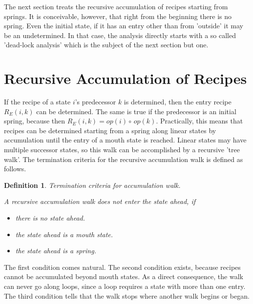 \documentclass[12pt,a4paper]{scrartcl}
\newtheorem{definition}{Definition}
\begin{document}
The next section treats the recursive accumulation of recipes starting from
springs.  It is conceivable, however, that right from the beginning there is no
spring.  Even the initial state, if it has an entry other than from 'outside'
it may be an undetermined.  In that case, the analysis directly starts with a
so called 'dead-lock analysis' which is the subject of the next section but
one.

%
\section{Recursive Accumulation of Recipes}

If the recipe of a state $i$'s predecessor $k$ is determined, then the entry
recipe $R_E(i,k)$ can be determined. The same is true if the predecessor is an initial
spring, because then $R_E(i,k) = op(i)\circ\,op(k)$. Practically, this means
that recipes can be determined starting from a spring along linear states by
accumulation until the entry of a mouth state is reached. Linear states may
have multiple successor states, so this walk can be accomplished by a recursive
'tree walk'.  The termination criteria for the recursive accumulation walk is
defined as follows.

\begin{definition}
Termination criteria for accumulation walk.

A recursive accumulation walk does not enter the state ahead, if 

\begin{itemize}
    \item there is no state ahead.
    \item the state ahead is a mouth state.
    \item the state ahead is a spring.
\end{itemize}
\end{definition}

The first condition comes natural. The second condition exists, because recipes
cannot be accumulated beyond mouth states. As a direct consequence, the walk
can never go along loops, since a loop requires a state with more than one
entry. The third condition tells that the walk stops where another walk begins
or began.  
\end{document}
